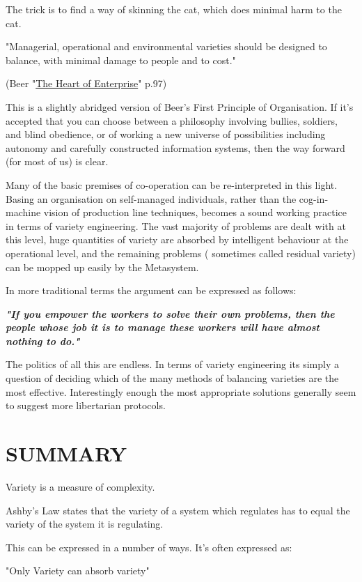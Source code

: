 The trick is to find a way of skinning the cat, which does minimal harm to the cat.

"Managerial, operational and environmental varieties should be designed to balance, with minimal damage to people and to cost."

(Beer "\href{https://vsmg.lrc.org.uk/screen.php?=bibliography}{The Heart of Enterprise}" p.97)

This is a slightly abridged version of Beer's First Principle of Organisation. If it's accepted that you can choose between a philosophy involving bullies, soldiers, and blind obedience, or of working a new universe of possibilities including autonomy and carefully constructed information systems, then the way forward (for most of us) is clear.

Many of the basic premises of co-operation can be re-interpreted in this light. Basing an organisation on self-managed individuals, rather than the cog-in-machine vision of production line techniques, becomes a sound working practice in terms of variety engineering. The vast majority of problems are dealt with at this level, huge quantities of variety are absorbed by intelligent behaviour at the operational level, and the remaining problems ( sometimes called residual variety) can be mopped up easily by the Metasystem.

In more traditional terms the argument can be expressed as follows:

\textbf{\textit{"If you empower the workers to solve their own problems, then the people whose job it is to manage these workers will have almost nothing to do."}}

The politics of all this are endless. In terms of variety engineering its simply a question of deciding which of the many methods of balancing varieties are the most effective. Interestingly enough the most appropriate solutions generally seem to suggest more libertarian protocols.

\section*{SUMMARY}
Variety is a measure of complexity.

Ashby's Law states that the variety of a system which regulates has to equal the variety of the system it is regulating.

This can be expressed in a number of ways. It's often expressed as:

"Only Variety can absorb variety"


